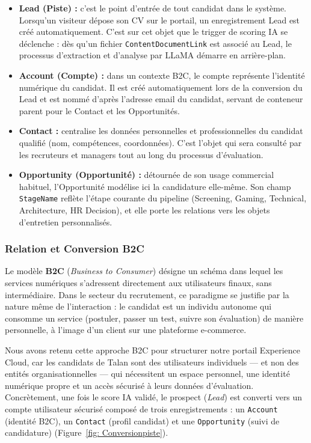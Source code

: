 \begin{itemize}
    \item \textbf{Lead (Piste) :} c'est le point d'entrée de tout candidat dans le système. Lorsqu'un visiteur dépose son CV sur le portail, un enregistrement Lead est créé automatiquement. C'est sur cet objet que le trigger de scoring IA se déclenche : dès qu'un fichier \texttt{ContentDocumentLink} est associé au Lead, le processus d'extraction et d'analyse par LLaMA démarre en arrière-plan.
    \item \textbf{Account (Compte) :} dans un contexte B2C, le compte représente l'identité numérique du candidat. Il est créé automatiquement lors de la conversion du Lead et est nommé d'après l'adresse email du candidat, servant de conteneur parent pour le Contact et les Opportunités.
    \item \textbf{Contact :} centralise les données personnelles et professionnelles du candidat qualifié (nom, compétences, coordonnées). C'est l'objet qui sera consulté par les recruteurs et managers tout au long du processus d'évaluation.
    \item \textbf{Opportunity (Opportunité) :} détournée de son usage commercial habituel, l'Opportunité modélise ici la candidature elle-même. Son champ \texttt{StageName} reflète l'étape courante du pipeline (Screening, Gaming, Technical, Architecture, HR Decision), et elle porte les relations vers les objets d'entretien personnalisés.
\end{itemize}

\subsubsection{Relation et Conversion B2C}

Le modèle \textbf{B2C} (\textit{Business to Consumer}) désigne un schéma dans lequel les services numériques s'adressent directement aux utilisateurs finaux, sans intermédiaire. Dans le secteur du recrutement, ce paradigme se justifie par la nature même de l'interaction : le candidat est un individu autonome qui consomme un service (postuler, passer un test, suivre son évaluation) de manière personnelle, à l'image d'un client sur une plateforme e-commerce.

\medskip

Nous avons retenu cette approche B2C pour structurer notre portail Experience Cloud, car les candidats de Talan sont des utilisateurs individuels --- et non des entités organisationnelles --- qui nécessitent un espace personnel, une identité numérique propre et un accès sécurisé à leurs données d'évaluation. Concrètement, une fois le score IA validé, le prospect (\textit{Lead}) est converti vers un compte utilisateur sécurisé composé de trois enregistrements : un \texttt{Account} (identité B2C), un \texttt{Contact} (profil candidat) et une \texttt{Opportunity} (suivi de candidature) (Figure~\ref{fig: Conversionpiste}).

